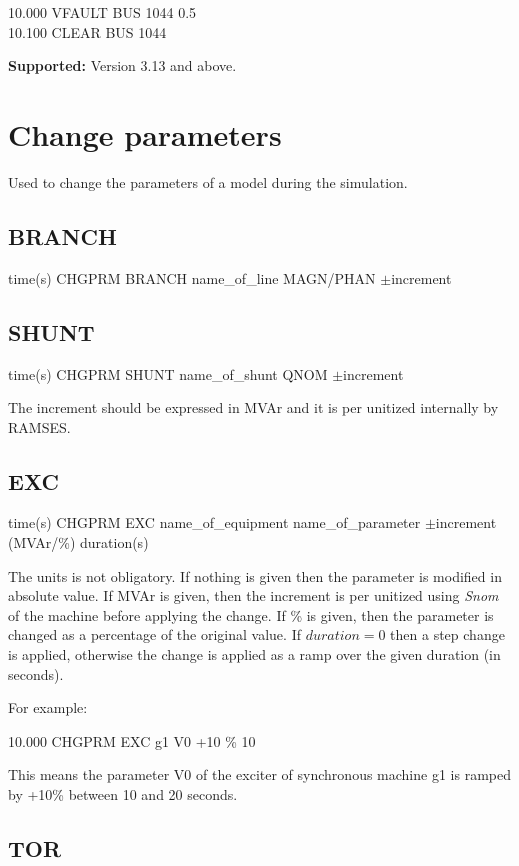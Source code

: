 10.000 VFAULT BUS 1044 0.5\\
10.100 CLEAR BUS 1044
	

\textbf{Supported:} Version 3.13 and above.


\section{Change parameters}\label{sec-chgprm}

Used to change the parameters of a model during the simulation.


\subsection{BRANCH}

time(s) CHGPRM BRANCH name\_of\_line MAGN/PHAN
	$\pm$increment 

\subsection{SHUNT}

time(s) CHGPRM SHUNT name\_of\_shunt QNOM $\pm$increment

The increment should be expressed in MVAr and it
is per unitized internally by RAMSES.


\subsection{EXC}

time(s) CHGPRM EXC name\_of\_equipment name\_of\_parameter
	$\pm$increment (MVAr/\%) duration(s) 
	
The units is
not obligatory. If nothing is given then the parameter is modified
in absolute value. If MVAr is given, then the increment is per unitized
using \emph{Snom} of the machine before applying the change. If \%
is given, then the parameter is changed as a percentage of the original
value. If $duration=0$ then a step change is applied, otherwise the
change is applied as a ramp over the given duration (in seconds).

For example:

10.000 CHGPRM EXC g1 V0 +10 \% 10 

This
means the parameter V0 of the exciter of synchronous machine g1 is
ramped by +10\% between 10 and 20 seconds.


\subsection{TOR}

